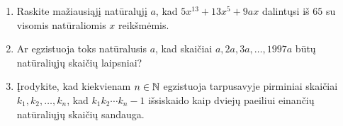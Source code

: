 \begin{enumerate}
  \item \text{[Ireland 2000]} Raskite mažiausiąjį natūralųjį $a$, kad
    $5x^{13} + 13x^5 + 9ax$ dalintųsi iš $65$ su visomis natūraliomis $x$
    reikšmėmis.
  \item Ar egzistuoja toks natūralusis $a$, kad skaičiai $a, 2a, 3a, \dots,
    1997a$ būtų natūraliųjų skaičių laipsniai?
  \item \text{[USAMO 2008]} Įrodykite, kad kiekvienam $n\in \mathbb N$
    egzistuoja tarpusavyje pirminiai skaičiai $k_1, k_2, \dots,
    k_n$, kad $k_1 k_2 \cdots k_n-1$ išsiskaido kaip dviejų paeiliui
    einančių natūraliųjų skaičių sandauga. 

\end{enumerate}
